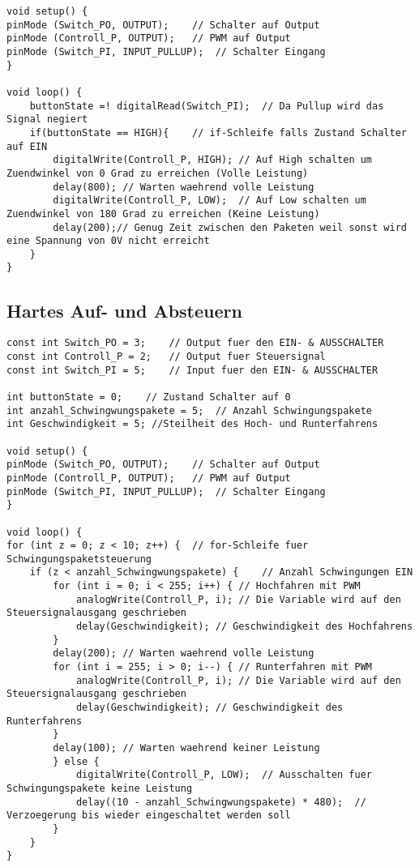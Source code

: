 \begin{appendix}
\begin{lstlisting}[basicstyle=\tiny,style=myArduino]
void setup() {
pinMode (Switch_PO, OUTPUT);	// Schalter auf Output
pinMode (Controll_P, OUTPUT);	// PWM auf Output
pinMode (Switch_PI, INPUT_PULLUP);	// Schalter Eingang
}

void loop() {
	buttonState =! digitalRead(Switch_PI);	// Da Pullup wird das Signal negiert
	if(buttonState == HIGH){	// if-Schleife falls Zustand Schalter auf EIN
		digitalWrite(Controll_P, HIGH);	// Auf High schalten um Zuendwinkel von 0 Grad zu erreichen (Volle Leistung)
		delay(800);	// Warten waehrend volle Leistung
		digitalWrite(Controll_P, LOW);	// Auf Low schalten um Zuendwinkel von 180 Grad zu erreichen (Keine Leistung)
		delay(200);// Genug Zeit zwischen den Paketen weil sonst wird eine Spannung von 0V nicht erreicht     
	}
}
\end{lstlisting}

\subsection*{Hartes Auf- und Absteuern}
\begin{lstlisting}[basicstyle=\tiny,style=myArduino]
const int Switch_PO = 3;	// Output fuer den EIN- & AUSSCHALTER
const int Controll_P = 2;	// Output fuer Steuersignal
const int Switch_PI = 5;	// Input fuer den EIN- & AUSSCHALTER

int buttonState = 0;	// Zustand Schalter auf 0
int anzahl_Schwingwungspakete = 5;	// Anzahl Schwingungspakete
int Geschwindigkeit = 5; //Steilheit des Hoch- und Runterfahrens

void setup() {
pinMode (Switch_PO, OUTPUT);	// Schalter auf Output
pinMode (Controll_P, OUTPUT);	// PWM auf Output
pinMode (Switch_PI, INPUT_PULLUP);	// Schalter Eingang
}

void loop() {
for (int z = 0; z < 10; z++) {	// for-Schleife fuer Schwingungspaketsteuerung
	if (z < anzahl_Schwingwungspakete) {	// Anzahl Schwingungen EIN
		for (int i = 0; i < 255; i++) {	// Hochfahren mit PWM
			analogWrite(Controll_P, i);	// Die Variable wird auf den Steuersignalausgang geschrieben
			delay(Geschwindigkeit);	// Geschwindigkeit des Hochfahrens
		}
		delay(200);	// Warten waehrend volle Leistung
		for (int i = 255; i > 0; i--) {	// Runterfahren mit PWM
			analogWrite(Controll_P, i);	// Die Variable wird auf den Steuersignalausgang geschrieben
			delay(Geschwindigkeit);	// Geschwindigkeit des Runterfahrens
		}
		delay(100);	// Warten waehrend keiner Leistung
		} else {
			digitalWrite(Controll_P, LOW);	// Ausschalten fuer Schwingungspakete keine Leistung
			delay((10 - anzahl_Schwingwungspakete) * 480);	// Verzoegerung bis wieder eingeschaltet werden soll
		}
	}
}
\end{lstlisting}


\end{appendix}
